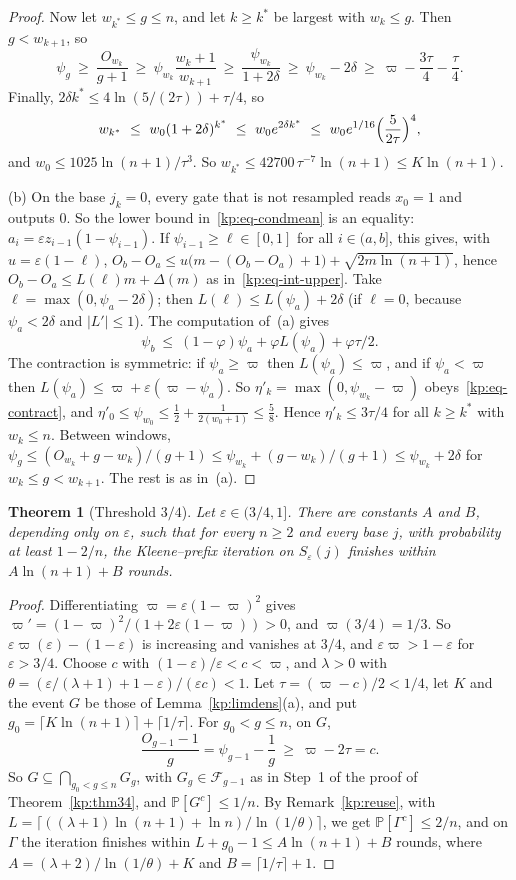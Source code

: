 \documentclass[11pt]{amsart}
\newtheorem{theorem}{Theorem}
\theoremstyle{definition}
\theoremstyle{remark}
\newcommand{\eps}{\varepsilon}
\newcommand{\PP}{\mathbb{P}}
\newcommand{\cF}{\mathcal{F}}
\begin{document}
\begin{proof}
Now let $w_{k^*}\le g\le n$, and let $k\ge k^*$ be largest with $w_k\le g$.
Then $g<w_{k+1}$, so
\[
  \psi_g\ \ge\ \frac{O_{w_k}}{g+1}\ \ge\ \psi_{w_k}\frac{w_k+1}{w_{k+1}}
  \ \ge\ \frac{\psi_{w_k}}{1+2\delta}\ \ge\ \psi_{w_k}-2\delta
  \ \ge\ \varpi-\frac{3\tau}4-\frac\tau4 .
\]
Finally, $2\delta k^*\le 4\ln(5/(2\tau))+\tau/4$, so
\[
  w_{k^*}\ \le\ w_0(1+2\delta)^{k^*}\ \le\ w_0e^{2\delta k^*}
  \ \le\ w_0e^{1/16}\Bigl(\frac{5}{2\tau}\Bigr)^4,
\]
and $w_0\le 1025\ln(n+1)/\tau^3$. So
$w_{k^*}\le 42700\,\tau^{-7}\ln(n+1)\le K\ln(n+1)$.

(b) On the base $j_k=0$, every gate that is not resampled reads $x_0=1$ and
outputs $0$. So the lower bound in~\eqref{kp:eq-condmean} is an equality:
$a_i=\eps z_{i-1}(1-\psi_{i-1})$. If $\psi_{i-1}\ge\ell\in[0,1]$ for all
$i\in(a,b]$, this gives, with $u=\eps(1-\ell)$,
$O_b-O_a\le u\bigl(m-(O_b-O_a)+1\bigr)+\sqrt{2m\ln(n+1)}$, hence
$O_b-O_a\le L(\ell)m+\Delta(m)$ as in~\eqref{kp:eq-int-upper}. Take
$\ell=\max(0,\psi_a-2\delta)$; then $L(\ell)\le L(\psi_a)+2\delta$ (if $\ell=0$,
because $\psi_a<2\delta$ and $|L'|\le 1$). The computation of~(a) gives
\[
  \psi_b\ \le\ (1-\varphi)\psi_a+\varphi L(\psi_a)+\varphi\tau/2 .
\]
The contraction is symmetric: if $\psi_a\ge\varpi$ then $L(\psi_a)\le\varpi$,
and if $\psi_a<\varpi$ then $L(\psi_a)\le\varpi+\eps(\varpi-\psi_a)$. So
$\eta'_k=\max(0,\psi_{w_k}-\varpi)$ obeys~\eqref{kp:eq-contract}, and
$\eta'_0\le\psi_{w_0}\le\frac12+\frac1{2(w_0+1)}\le\frac58$. Hence
$\eta'_k\le 3\tau/4$ for all $k\ge k^*$ with $w_k\le n$. Between windows,
$\psi_g\le(O_{w_k}+g-w_k)/(g+1)\le\psi_{w_k}+(g-w_k)/(g+1)\le\psi_{w_k}+2\delta$
for $w_k\le g<w_{k+1}$. The rest is as in~(a).
\end{proof}

\begin{theorem}[Threshold $3/4$]\label{kp:thm39}
Let $\eps\in(3/4,1]$. There are constants $A$ and $B$, depending only on
$\eps$, such that for every $n\ge 2$ and every base $j$, with probability at
least $1-2/n$, the Kleene--prefix iteration on $S_\eps(j)$ finishes within
$A\ln(n+1)+B$ rounds.
\end{theorem}

\begin{proof}
Differentiating $\varpi=\eps(1-\varpi)^2$ gives
$\varpi'=(1-\varpi)^2/(1+2\eps(1-\varpi))>0$, and $\varpi(3/4)=1/3$. So
$\eps\varpi(\eps)-(1-\eps)$ is increasing and vanishes at $3/4$, and
$\eps\varpi>1-\eps$ for $\eps>3/4$. Choose $c$ with $(1-\eps)/\eps<c<\varpi$,
and $\lambda>0$ with $\theta=(\eps/(\lambda+1)+1-\eps)/(\eps c)<1$. Let
$\tau=(\varpi-c)/2<1/4$, let $K$ and the event $G$ be those of
Lemma~\ref{kp:limdens}(a), and put
$g_0=\lceil K\ln(n+1)\rceil+\lceil 1/\tau\rceil$. For $g_0<g\le n$, on $G$,
\[
  \frac{O_{g-1}-1}{g}=\psi_{g-1}-\frac1g\ \ge\ \varpi-2\tau=c .
\]
So $G\subseteq\bigcap_{g_0<g\le n}G_g$, with $G_g\in\cF_{g-1}$ as in Step~1 of
the proof of Theorem~\ref{kp:thm34}, and $\PP[G^c]\le 1/n$. By
Remark~\ref{kp:reuse}, with
$L=\lceil((\lambda+1)\ln(n+1)+\ln n)/\ln(1/\theta)\rceil$, we get
$\PP[\Gamma^c]\le 2/n$, and on $\Gamma$ the iteration finishes within
$L+g_0-1\le A\ln(n+1)+B$ rounds, where $A=(\lambda+2)/\ln(1/\theta)+K$ and
$B=\lceil 1/\tau\rceil+1$.
\end{proof}
\end{document}
